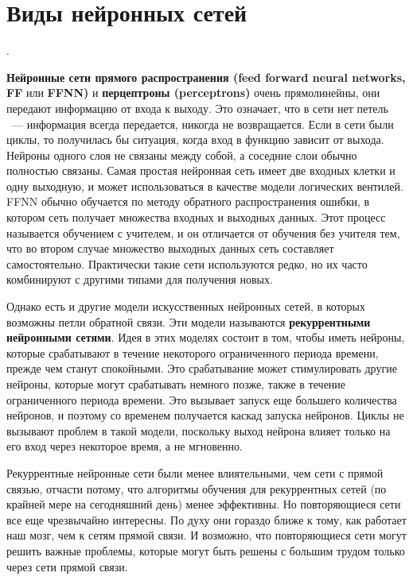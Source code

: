 \section{Виды нейронных сетей}.

 \textbf{Нейронные сети прямого распространения 
(feed forward neural networks, FF} или \textbf{FFNN)} и 
\textbf{перцептроны (perceptrons)} очень прямолинейны, они передают информацию от входа к выходу. Это означает, что в сети нет петель ~--- информация всегда передается, никогда не возвращается. Если в сети были циклы, то получилась бы ситуация, когда вход в функцию зависит от выхода. Нейроны одного слоя не связаны между собой, а соседние слои обычно полностью связаны. Самая простая нейронная сеть имеет две входных клетки и одну выходную, и может использоваться в качестве модели логических вентилей. FFNN обычно обучается по методу обратного распространения ошибки, в котором сеть получает множества входных и выходных данных. Этот процесс называется обучением с учителем, и он отличается от обучения без учителя тем, что во втором случае множество выходных данных сеть составляет самостоятельно. Практически такие сети используются редко, но их часто комбинируют с другими типами для получения новых. 

Однако есть и другие модели искусственных нейронных сетей, в которых возможны петли обратной связи. Эти модели называются \textbf{рекуррентными нейронными сетями}. Идея в этих моделях состоит в том, чтобы иметь нейроны, которые срабатывают в течение некоторого ограниченного периода времени, прежде чем станут спокойными. Это срабатывание может стимулировать другие нейроны, которые могут срабатывать немного позже, также в течение ограниченного периода времени. Это вызывает запуск еще большего количества нейронов, и поэтому со временем получается каскад запуска нейронов. Циклы не вызывают проблем в такой модели, поскольку выход нейрона влияет только на его вход через некоторое время, а не мгновенно. 

Рекуррентные нейронные сети были менее влиятельными, чем сети с прямой связью, отчасти потому, что алгоритмы обучения для рекуррентных сетей (по крайней мере на сегодняшний день) менее эффективны. Но повторяющиеся сети все еще чрезвычайно интересны. По духу они гораздо ближе к тому, как работает наш мозг, чем к сетям прямой связи. И возможно, что повторяющиеся сети могут решить важные проблемы, которые могут быть решены с большим трудом только через сети прямой связи. 

